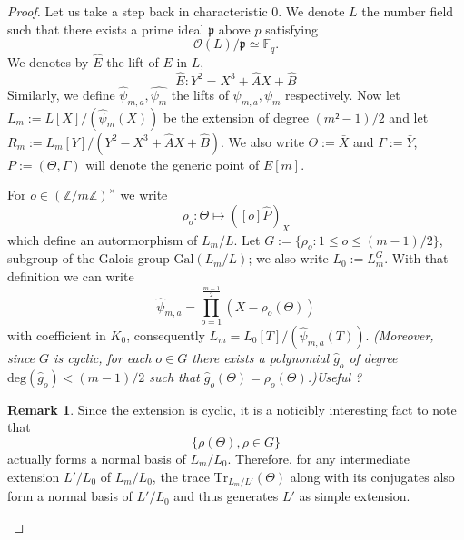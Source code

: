 \documentclass[12pt]{article}
\theoremstyle{plain}
\theoremstyle{definition}
\newtheorem*{remark}{Remark}
\def\Z{\ensuremath{\mathbb{Z}}}
\def\F{\ensuremath{\mathbb{F}}}
\begin{document}
\begin{proof}
Let us take a step back in characteristic $0$. We denote $L$ the number field 
such that there exists a prime ideal $\mathfrak{p}$ above $p$ satisfying 
\begin{equation}
\mathcal{O}(L)/\mathfrak{p} \simeq \F_q.
\end{equation}
We denotes by $\widehat{E}$ the lift of $E$ in $L$,
\[
\widehat{E} : Y^2 = X^3 + \widehat{A}X + \widehat{B}
\]
Similarly, we define $\widehat{\psi}_{m,a}, \widehat{\psi_m}$ the lifts of 
$\psi_{m,a}, \psi_m$ respectively. Now let $L_m := 
L[X]/(\widehat{\psi}_m(X))$ be the extension of degree $(m²-1)/2$ and let 
$R_m := L_m[Y]/(Y^2 - X^3 + \widehat{A}X + \widehat{B})$. We also write $\Theta
:=\bar{X}$ and $\Gamma:=\bar{Y}$, $P:=(\Theta, \Gamma)$ will denote the generic 
point of $E[m]$.

For $o\in(\Z/m\Z)^{\times}$ we write
\begin{equation}
\rho_o : \Theta \mapsto ([o]\widehat{P})_X
\end{equation}
which define an autormorphism of $L_m/L$. Let $G := \lbrace{\rho_o : 1 \leq o
\leq (m-1)/2}\rbrace$, subgroup of the Galois group $\text{Gal}(L_m/L)$; we also 
write $L_0 := L_m^G$. With that definition we can write 
\begin{equation}
\widehat{\psi}_{m,a}=\prod_{o=1}^{\tfrac{m-1}{2}}{(X-\rho_o(\Theta))}
\end{equation}
with coefficient in $K_0$, consequently $L_m = L_0[T]/(\widehat{\psi}_{m,a}(T))$.
\emph{(Moreover, since $G$ is cyclic, for each $o\in G$ there exists a polynomial
$\widehat{g}_o$ of degree $\text{deg}(\widehat{g}_o) < (m-1)/2$ such that
$\widehat{g}_o(\Theta) = \rho_o(\Theta)$.)Useful ?}

\begin{remark}
Since the extension is cyclic, it is a noticibly interesting fact to note that
\[
\lbrace{\rho(\Theta), \rho\in G}\rbrace
\]
actually forms a normal basis of $L_m/L_0$.
Therefore, for any intermediate extension $L'/L_0$ of $L_m/L_0$, the trace
$\text{Tr}_{L_m/L'}(\Theta)$ along with its conjugates also form a normal basis
of $L'/L_0$ and thus generates $L'$ as simple extension.
\end{remark}


\end{proof}
\end{document}
